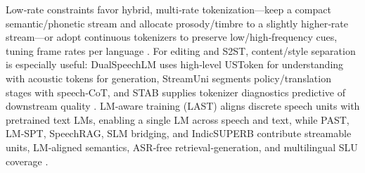 Low‑rate constraints favor hybrid, multi‑rate tokenization—keep a compact semantic/phonetic stream and allocate prosody/timbre to a slightly higher‑rate stream—or adopt continuous tokenizers to preserve low/high‑frequency cues, tuning frame rates per language \cite{li2025continuousspeechtokenizertext,zhang2025impactframeratesspeechtokenizercasestudy,yang2025almtokenizerlowbitratesemanticrichaudioc,yang2025diffsoundstreamefficientspeechtokenizati}. For editing and S2ST, content/style separation is especially useful: DualSpeechLM uses high‑level USToken for understanding with acoustic tokens for generation, StreamUni segments policy/translation stages with speech‑CoT, and STAB supplies tokenizer diagnostics predictive of downstream quality \cite{wang2025dualspeechlmtowardsunifiedspeechundersta,guo2025streamuniachievingstreamingspeechtransla,vashishth2024stabspeechtokenizerassessmentbenchmark}. LM‑aware training (LAST) aligns discrete speech units with pretrained text LMs, enabling a single LM across speech and text, while PAST, LM‑SPT, SpeechRAG, SLM bridging, and IndicSUPERB contribute streamable units, LM‑aligned semantics, ASR‑free retrieval‑generation, and multilingual SLU coverage \cite{turetzky2024lastlanguagemodelawarespeechtokenization,har-tuv2025pastphoneticacousticspeechtokenizer,jo2025lmsptalignedsemanticdistillationspeechto,min2025speechretrievalaugmentedgenerationwithou,wang2023slmbridgethingapbetweenspeechtextfoundat,entry2025indicsuperbspeechprocessinguniversalperf}. 

